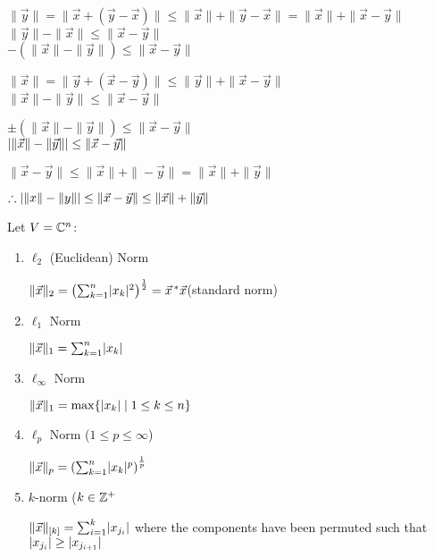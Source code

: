 \documentclass[letterpaper,12pt,fleqn]{article}
\newcommand{\vx}{\vec{x}}
\newcommand{\vy}{\vec{y}}
\newcommand{\norm}[1]{\|#1\|}
\begin{document}
\begin{theproof}
  $\norm{\vy}=\norm{\vx+(\vy-\vx)}\le\norm{\vx}+\norm{\vy-\vx}=
  \norm{\vx}+\norm{\vx-\vy}$ \\
  $\norm{\vy}-\norm{\vx}\le\norm{\vx-\vy}$ \\
  $-(\norm{\vx}-\norm{\vy})\le\norm{\vx-\vy}$

  $\norm{\vx}=\norm{\vy+(\vx-\vy)}\le\norm{\vy}+\norm{\vx-\vy}$ \\
  $\norm{\vx}-\norm{\vy}\le\norm{\vx-\vy}$

  $\pm(\norm{\vx}-\norm{\vy})\le\norm{\vx-\vy}$ \\
  $\abs{\norm{\vx}-\norm{\vy}}\le\norm{\vx-\vy}$

  $\norm{\vx-\vy}\le\norm{\vx}+\norm{-\vy}=\norm{\vx}+\norm{\vy}$

  $\therefore\abs{\norm{x}-\norm{y}}\le\norm{\vx-\vy}\le\norm{\vx}+\norm{\vy}$
\end{theproof}

\begin{example}
  Let $V=\mathbb{C}^n$:
  \begin{enumerate}
  \item $\ell_2$ (Euclidean) Norm

    $\norm{\vx}_2=\left(\sum_{k=1}^n\abs{x_k}^2\right)^{\frac{1}{2}}=
    \vx^{\,*}\vx$\hspace{2ex}(standard norm)

  \item $\ell_1$ Norm

    $\norm{\vx}_1=\sum_{k=1}^n\abs{x_k}$

  \item $\ell_{\infty}$ Norm
    
    $\norm{\vx}_1=\max\{\abs{x_k}\mid 1\le k\le n\}$

  \item $\ell_p$ Norm ($1\le p\le \infty$)

    $\norm{\vx}_p=\left(\sum_{k=1}^n\abs{x_k}^p\right)^{\frac{1}{p}}$

  \item $k$-norm ($k\in\mathbb{Z}^+$

    $\norm{\vx}_{[k]}=\sum_{i=1}^k\abs{x_{j_i}}$ where the components have been
    permuted such that $\lvert x_{j_i}\rvert\ge\lvert x_{j_{i+1}}\rvert$
  \end{enumerate}
\end{example}
\end{document}
